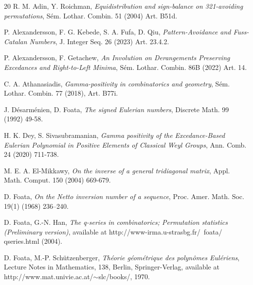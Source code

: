 \documentclass[12pt]{article}
\begin{document}

\begin{thebibliography}{20}	
R. M. Adin, Y. Roichman, \textit{Equidistribution and sign-balance on 321-avoiding permutations}, 
 S{\'e}m. Lothar. Combin. 51 (2004) Art. B51d.

P. Alexandersson, F. G. Kebede, S. A. Fufa, D. Qiu,
\textit{Pattern-Avoidance and Fuss-Catalan Numbers},
J. Integer Seq. 26 (2023) Art. 23.4.2.

P. Alexandersson, F. Getachew,
\textit{An Involution on Derangements Preserving Excedances and Right-to-Left Minima}, S{\'e}m. Lothar. Combin. 86B (2022) Art. 14.

C. A. Athanasiadis, 
\textit{Gamma-positivity in combinatorics and geometry}, S{\'e}m. Lothar. Combin. 77 (2018), Art. B77i.

J. D{\'e}sarm{\'e}nien, D. Foata, \textit{The signed Eulerian numbers}, Discrete Math. 99 (1992) 49-58.


H. K. Dey, S. Sivasubramanian, \textit{Gamma positivity of the Excedance-Based Eulerian Polynomial in Positive Elements
of Classical Weyl Groups}, Ann. Comb. 24 (2020) 711-738.

M. E. A. El-Mikkawy, \textit{On the inverse of a general tridiagonal matrix}, Appl. Math. Comput. 150 (2004) 669-679. 


D. Foata, \textit{On the Netto inversion number of a sequence}, Proc. Amer. Math. Soc. 19(1) (1968) 236–240. 

D. Foata, G.-N. Han, \textit{The q-series in combinatorics; Permutation statistics (Preliminary version)}, available at http://www-irma.u-strasbg.fr/~foata/
qseries.html (2004).

D. Foata, M.-P. Sch{\"u}tzenberger, \textit{Th{\'e}orie g{\'e}om{\'e}trique des polyn{\^o}mes  {E}ul{\'e}riens},
Lecture Notes in Mathematics, 138, Berlin, Springer-Verlag, available at http://www.mat.univie.ac.at/$\sim$slc/books/, 1970. 


\end{thebibliography}
\end{document}
